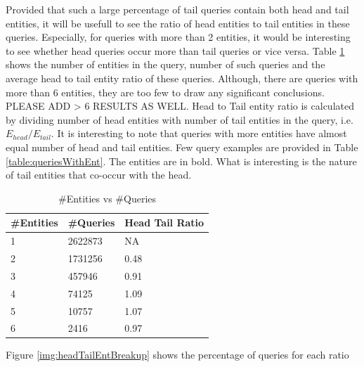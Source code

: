 Provided that such a large percentage of tail queries contain both head and tail entities, it 
will be usefull to see the ratio of head entities to tail entities in these queries. Especially, 
for queries with more than 2 entities, it would be interesting to see whether head queries occur more
than tail queries or vice versa. Table \ref{table:entDist} shows the number of entities in the query, 
number of such queries and the average head to tail entity ratio of these queries.
Although, there are queries with more than 6 entities, they are too few to draw any significant 
conclusions. PLEASE ADD > 6 RESULTS AS WELL. 
Head to Tail entity ratio is calculated by dividing number of head entities with number of 
tail entities in the query, i.e. $E_{head}/E_{tail}$. It is interesting to note that queries with
more entities have almost equal number of head and tail entities. Few query examples are provided in
Table \ref{table:queriesWithEnt}. The entities are in bold. What is interesting is the nature of tail
entities that co-occur with the head. 

\begin{table}
\caption{\#Entities vs \#Queries}
\label{table:entDist}
\centering
\begin{tabular}{|l|l|l|}
\hline
\#Entities & \#Queries & Head Tail Ratio \\ \hline
1 & 2622873 & NA \\ \hline
2 & 1731256 & 0.48 \\ \hline
3 & 457946  & 0.91 \\ \hline
4 & 74125 & 1.09  \\ \hline
5 & 10757 & 1.07 \\ \hline
6 & 2416  & 0.97 \\ \hline
\end{tabular}
\end{table}


Figure \ref{img:headTailEntBreakup} shows the percentage of queries for each ratio 

